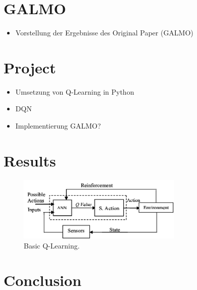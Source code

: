 \documentclass[a4paper]{article}
\begin{document}
	\section{GALMO}
	\label{sec:galmo}
	\begin{itemize}
		\item Vorstellung der Ergebnisse des Original Paper (GALMO)
	\end{itemize}
	
	\section{Project}
	\label{sec:project}
	\begin{itemize}
		\item Umsetzung von Q-Learning in Python
		\item DQN
		\item Implementierung GALMO?
	\end{itemize}
	
	\section{Results}
	\label{sec:results}
	
	
	\begin{figure}[t]
		\centering
		\includegraphics[angle=0,width=0.7\textwidth]{./figs/RL_ANN.png}
		\caption{\label{fig:image}Basic Q-Learning.}
	\end{figure}
	
	
	
	\section{Conclusion}
	
	
	\footnotesize
	
	
	
\end{document}
